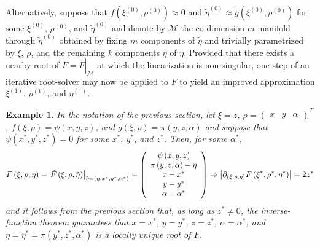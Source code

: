 \documentclass{article}
\newtheorem{example}[theorem]{Example}
\begin{document}
Alternatively, suppose that $f\left( \xi ^{\left( 0\right) },\rho ^{\left(
0\right) }\right) \approx 0$ and $\tilde{\eta}^{\left( 0\right) }\approx 
\tilde{g}\left( \xi ^{\left( 0\right) },\rho ^{\left( 0\right) }\right) $
for some $\xi ^{\left( 0\right) }$, $\rho ^{\left( 0\right) }$, and $\tilde{
\eta}^{\left( 0\right) }$ and denote by $\mathcal{M}$ the co-dimension-$m$
manifold through $\tilde{\eta}^{\left( 0\right) }$ obtained by fixing $m$
components of $\tilde{\eta}$ and trivially parametrized by $\xi $, $\rho $,
and the remaining $k$ components $\eta $ of $\tilde{\eta}$. Provided that
there exists a nearby root of $F=\left. \tilde{F}\right| _{\mathcal{M}}$ at
which the linearization is non-singular, one step of an iterative
root-solver may now be applied to $F$ to yield an improved approximation $
\xi ^{\left( 1\right) }$, $\rho ^{\left( 1\right) }$, and $\eta ^{\left(
1\right) }$.

\begin{example}
In the notation of the previous section, let $\xi =z$, $\rho =\left( 
\begin{array}{ccc}
x & y & \alpha 
\end{array}%
\right) ^{T}$, $f\left( \xi ,\rho \right) =\psi \left( x,y,z\right) $, and $%
g\left( \xi ,\rho \right) =\pi \left( y,z,\alpha \right) $ and suppose that $%
\psi \left( x^{\ast },y^{\ast },z^{\ast }\right) =0$ for some $x^{\ast }$, $%
y^{\ast }$, and $z^{\ast }$. Then, for some $\alpha ^{\ast }$, 
\[
F\left( \xi ,\rho ,\eta \right) =\left. \tilde{F}\left( \xi ,\rho ,\tilde{%
\eta}\right) \right| _{\tilde{\eta}=\left( \eta ,x^{\ast },y^{\ast },\alpha
^{\ast }\right) }=\left( 
\begin{array}{c}
\psi \left( x,y,z\right)  \\ 
\pi \left( y,z,\alpha \right) -\eta  \\ 
x-x^{\ast } \\ 
y-y^{\ast } \\ 
\alpha -\alpha ^{\ast }%
\end{array}%
\right) \Rightarrow \left| \partial _{\left( \xi ,\rho ,\eta \right)
}F\left( \xi ^{\ast },\rho ^{\ast },\eta ^{\ast }\right) \right| =2z^{\ast }
\]%
and it follows from the previous section that, as long as $z^{\ast }\neq 0$,
the inverse-function theorem guarantees that $x=x^{\ast }$, $y=y^{\ast }$, $%
z=z^{\ast }$, $\alpha =\alpha ^{\ast }$, and $\eta =\eta ^{\ast }=\pi \left(
y^{\ast },z^{\ast },\alpha ^{\ast }\right) $ is a locally unique root of $F$.
\end{example}
\end{document}
